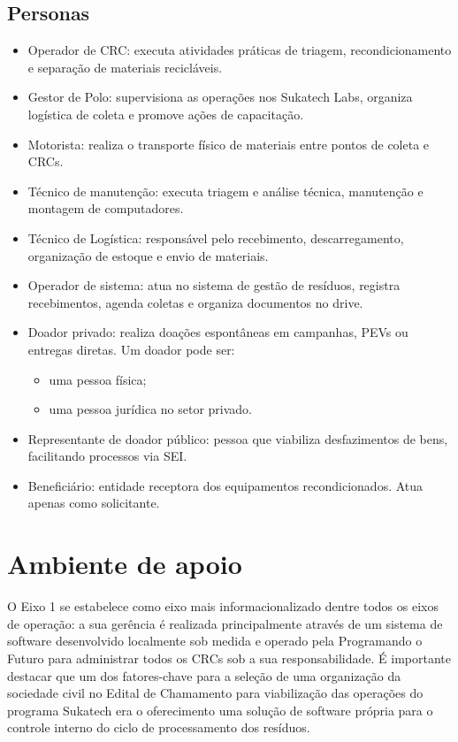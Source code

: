 \documentclass[
	12pt,				%
	openright,			%
	twoside,			%
	a4paper,			%
	english,			%
	french,				%
	spanish,			%
	brazil,				%
	]{abntex2}
\begin{document}
\subsection{Personas}
\begin{itemize}
  \item Operador de CRC: executa atividades práticas de triagem, recondicionamento e separação de materiais recicláveis.
  \item Gestor de Polo: supervisiona as operações nos Sukatech Labs, organiza logística de coleta e promove ações de capacitação. 
  \item Motorista: realiza o transporte físico de materiais entre pontos de coleta e CRCs.
  \item Técnico de manutenção: executa triagem e análise técnica, manutenção e montagem de computadores.
  \item Técnico de Logística: responsável pelo recebimento, descarregamento, organização de estoque e envio de materiais.
  \item Operador de sistema: atua no sistema de gestão de resíduos, registra recebimentos, agenda coletas e organiza documentos no drive.
  \item Doador privado: realiza doações espontâneas em campanhas, PEVs ou entregas diretas. Um doador pode ser:
  \begin{itemize}
    \item uma pessoa física;
    \item uma pessoa jurídica no setor privado.
  \end{itemize}
  \item Representante de doador público: pessoa que viabiliza desfazimentos de bens, facilitando processos via SEI.
  \item Beneficiário: entidade receptora dos equipamentos recondicionados. Atua apenas como solicitante.
\end{itemize}
    
\section{Ambiente de apoio} 
O Eixo 1 se estabelece como eixo mais informacionalizado dentre todos os eixos de operação: a sua gerência é realizada principalmente através de um sistema de software desenvolvido localmente sob medida e operado pela Programando o Futuro para administrar todos os CRCs sob a sua responsabilidade. É importante destacar que um dos fatores-chave para a seleção de uma organização da sociedade civil no Edital de Chamamento para viabilização das operações do programa Sukatech era o oferecimento uma solução de software própria para o controle interno do ciclo de processamento dos resíduos.
\end{document}
